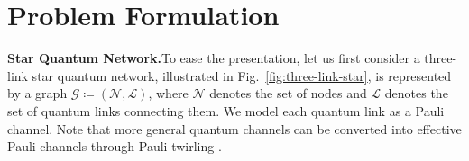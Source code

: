 

\section{Problem Formulation}
\label{sec:problem-formulation}


\textbf{Star Quantum Network.}To ease the presentation, let us first consider  a  three-link star quantum network, illustrated in
Fig.~\ref{fig:three-link-star}, is represented by a graph
\(\mathcal G\coloneqq(\mathcal N,\mathcal L)\), where
\(\mathcal N\) denotes the set of nodes and
\(\mathcal L\) denotes the set of quantum links connecting them.
We model each quantum link as a Pauli channel. Note that more general quantum
channels can be converted into effective Pauli channels through
Pauli twirling
\cite{PhysRevA.72.052326,PhysRevA.54.3824}.

